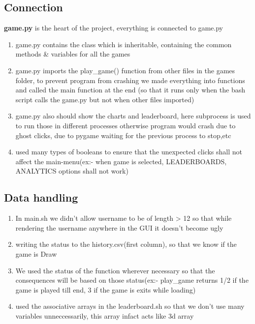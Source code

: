 \documentclass[12pt]{article}
\begin{document}
\subsection{Connection}
\textbf{game.py} is the heart of the project, everything is connected to game.py
\begin{enumerate}
    \item game.py contains the class which is inheritable, containing the common methods \& variables for all the games
    \item game.py imports the play\_game() function from other files in the games folder, to prevent program from crashing we made everything into functions and called the main function at the end (so that it runs only when the bash script calls the game.py but not when other files imported)
    \item game.py also should show the charts and leaderboard, here subprocess is used to run those in different processes otherwise program would crash due to ghost clicks, due to pygame waiting for the previous process to stop,etc
    \item used many types of booleans to ensure that the unexpected clicks shall not affect the main-menu(ex:- when game is selected, LEADERBOARDS, ANALYTICS options shall not work)
\end{enumerate}

\subsection{Data handling}
\begin{enumerate}
    \item In main.sh we didn't allow username to be of length > 12 so that while rendering the username anywhere in the GUI it doesn't become ugly
    \item writing the status to the history.csv(first column), so that we know if the game is Draw
    \item We used the status of the function wherever necessary so that the consequences will be based on those status(ex:- play\_game returns 1/2 if the game is played till end, 3 if the game is exits while loading)
    \item used the associative arrays in the leaderboard.sh so that we don't use many variables unneccessarily, this array infact acts like 3d array
\end{enumerate}
\end{document}
